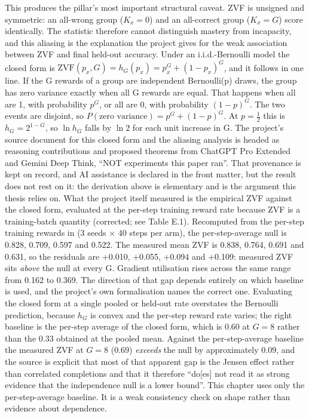 \documentclass[12pt,a4paper]{report}
\DeclareRobustCommand{\longtok}[1]{\texttt{\seqsplit{#1}}}
\begin{document}
This produces the pillar's most important structural caveat. ZVF is
unsigned and symmetric: an all-wrong group (\(K_x = 0\)) and an
all-correct group (\(K_x = G\)) score identically. The statistic
therefore cannot distinguish mastery from incapacity, and this aliasing
is the explanation the project gives for the weak association between
ZVF and final held-out accuracy. Under an i.i.d.-Bernoulli model the
closed form is \(\mathrm{ZVF}(p_x, G) = h_G(p_x) = p_x^G + (1-p_x)^G\),
and it follows in one line. If the G rewards of a group are independent
Bernoulli(p) draws, the group has zero variance exactly when all G
rewards are equal. That happens when all are 1, with probability
\(p^G\), or all are 0, with probability \((1-p)^G\). The two events are
disjoint, so \(P(\text{zero variance}) = p^G + (1-p)^G\). At
\(p = \tfrac12\) this is \(h_G = 2^{1-G}\), so \(\ln h_G\) falls by
\(\ln 2\) for each unit increase in G. The project's source document for
this closed form and the aliasing analysis is headed as reasoning
contributions and proposed theorems from ChatGPT Pro Extended and Gemini
Deep Think, ``NOT experiments this paper ran''. That provenance is kept
on record, and AI assistance is declared in the front matter, but the
result does not rest on it: the derivation above is elementary and is
the argument this thesis relies on. What the project itself measured is
the empirical ZVF against the closed form, evaluated at the per-step
training reward rate because ZVF is a training-batch quantity
(corrected; see Table E.1). Recomputed from the per-step training
rewards in
\longtok{platform\_hybrid/experiments/results/groupsize\_\allowbreak{}zvf\_\allowbreak{}sweep.json}
(3 seeds × 40 steps per arm), the per-step-average null is 0.828, 0.709,
0.597 and 0.522. The measured mean ZVF is 0.838, 0.764, 0.691 and 0.631,
so the residuals are +0.010, +0.055, +0.094 and +0.109: measured ZVF
sits \emph{above} the null at every G. Gradient utilisation rises across
the same range from 0.162 to 0.369. The direction of that gap depends
entirely on which baseline is used, and the project's own formalisation
names the correct one. Evaluating the closed form at a single pooled or
held-out rate overstates the Bernoulli prediction, because \(h_G\) is
convex and the per-step reward rate varies; the right baseline is the
per-step average of the closed form, which is \(0.60\) at \(G = 8\)
rather than the \(0.33\) obtained at the pooled mean. Against the
per-step-average baseline the measured ZVF at \(G = 8\) (\(0.69\))
\emph{exceeds} the null by approximately \(0.09\), and the source is
explicit that most of that apparent gap is the Jensen effect rather than
correlated completions and that it therefore ``do{[}es{]} not read it as
strong evidence that the independence null is a lower bound''. This
chapter uses only the per-step-average baseline. It is a weak
consistency check on shape rather than evidence about dependence.
\end{document}
